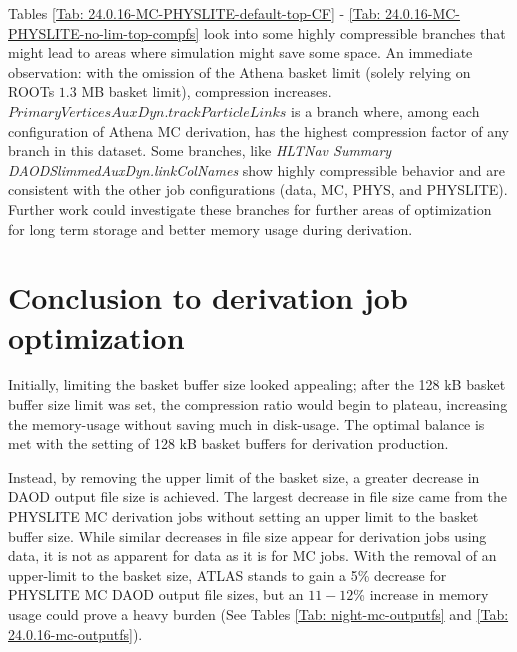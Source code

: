 Tables \ref{Tab: 24.0.16-MC-PHYSLITE-default-top-CF} - \ref{Tab: 24.0.16-MC-PHYSLITE-no-lim-top-compfs} look into some highly compressible branches that might lead to areas where simulation might save some space. 
An immediate observation: with the omission of the Athena basket limit (solely relying on ROOTs $1.3$ MB basket limit), compression increases.   
$\textit{PrimaryVerticesAuxDyn.trackParticleLinks}$ is a branch where, among each configuration of Athena MC derivation, has the highest compression factor of any branch in this dataset. 
Some branches, like \textit{HLTNav Summary DAODSlimmedAuxDyn.linkColNames} show highly compressible behavior and are consistent with the other job configurations (data, MC, PHYS, and PHYSLITE). 
Further work could investigate these branches for further areas of optimization for long term storage and better memory usage during derivation.
\vspace{10px}




\pagebreak
\section{Conclusion to derivation job optimization}
\label{sec:DAODProd_Results_conclusion}

Initially, limiting the basket buffer size looked appealing; after the 128 kB basket buffer size limit was set, the compression ratio would begin to plateau, increasing the memory-usage without saving much in disk-usage. 
The optimal balance is met with the setting of 128 kB basket buffers for derivation production. 

Instead, by removing the upper limit of the basket size, a greater decrease in DAOD output file size is achieved. 
The largest decrease in file size came from the PHYSLITE MC derivation jobs without setting an upper limit to the basket buffer size. 
While similar decreases in file size appear for derivation jobs using data, it is not as apparent for data as it is for MC jobs. 
With the removal of an upper-limit to the basket size, ATLAS stands to gain a 5\% decrease for PHYSLITE MC DAOD output file sizes, but an $11 - 12$\% increase in memory usage could prove a heavy burden (See Tables \ref{Tab: night-mc-outputfs} and \ref{Tab: 24.0.16-mc-outputfs}).

